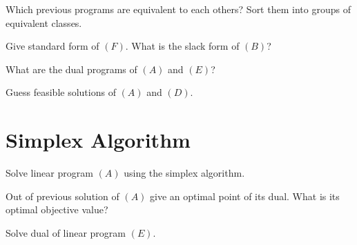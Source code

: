 \documentclass[11pt,a4paper]{article}
\begin{document}
\begin{question}{3}
  Which previous programs are equivalent to each others? Sort them
  into groups of equivalent classes.
\end{question}

\begin{question}{2}
  Give standard form of $(F)$. What is the slack form of $(B)$?
\end{question}

\begin{question}{2}
  What are the dual programs of $(A)$ and $(E)$?
\end{question}

\begin{question}{2}
  Guess feasible solutions of $(A)$ and $(D)$.
\end{question}

\section{Simplex Algorithm}

\begin{question}{4}
  Solve linear program $(A)$ using the simplex algorithm.
\end{question}

\begin{question}{2}
  Out of previous solution of $(A)$ give an optimal point of its
  dual. What is its optimal objective value?
\end{question}

\begin{question}{5}
  Solve dual of linear program $(E)$.
\end{question}
\end{document}
